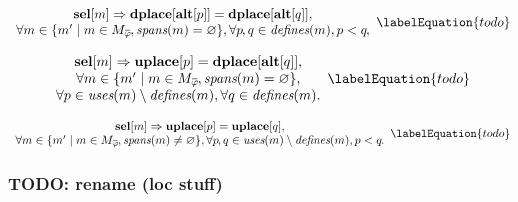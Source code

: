 \begin{equation}
  \begin{array}{c}
    \mVar{sel}[m]
    \mImp
    \mVar{dplace}[\mVar{alt}[p]] = \mVar{dplace}[\mVar{alt}[q]], \\
    \forall m \in
      \mSetBuilder{m'}%
                  {%
                    m \in \mPhiMatchCompSet \hspace{-1pt},
                    \mSpans(m) = \mEmptySet
                  },
    \forall p \hspace{-.8pt}, q \in \mDefines(m), p < q \hspace{-.8pt},
  \end{array}
  \labelEquation{todo}
\end{equation}

\begin{equation}
  \begin{array}{c}
    \mVar{sel}[m]
    \mImp
    \mVar{uplace}[p] = \mVar{dplace}[\mVar{alt}[q]], \\
    \forall m \in
      \mSetBuilder{m'}%
                  {%
                    m \in \mPhiMatchCompSet \hspace{-1pt},
                    \mSpans(m) = \mEmptySet
                  }, \\
    \forall p \in \mUses(m) \setminus \mDefines(m),
    \forall q \in \mDefines(m).
  \end{array}
  \labelEquation{todo}
\end{equation}



\begin{equation}
  \begin{array}{c}
    \mVar{sel}[m] \mImp \mVar{uplace}[p] = \mVar{uplace}[q], \\
    \forall m \in
      \mSetBuilder{m'}%
                  {%
                    m \in \mPhiMatchCompSet \hspace{-1pt},
                    \mSpans(m) \neq \mEmptySet
                  },
    \forall p \hspace{-.8pt}, q \in \mUses(m) \setminus \mDefines(m),
    p < q \hspace{-.8pt}.
  \end{array}
  \labelEquation{todo}
\end{equation}


\subsubsection{TODO: rename (loc stuff)}

